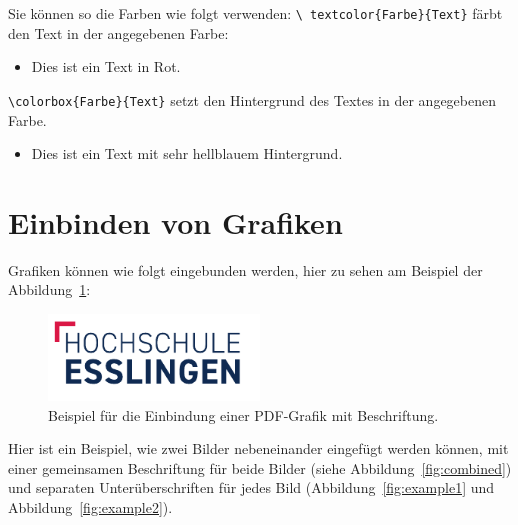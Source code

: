 \noindent Sie können so die Farben wie folgt verwenden: \texttt{\textbackslash
textcolor\{Farbe\}\{Text\}} färbt den Text in der angegebenen Farbe:

\begin{itemize}
  \item \textcolor{hse-rot}{Dies ist ein Text in Rot.}
\end{itemize}

\noindent \texttt{\textbackslash colorbox\{Farbe\}\{Text\}} setzt den Hintergrund des
Textes in der angegebenen Farbe.

\begin{itemize}
  \item \colorbox{hse-blau15}{Dies ist ein Text mit sehr hellblauem Hintergrund.}
\end{itemize}



\section*{Einbinden von Grafiken}

Grafiken können wie folgt eingebunden werden, hier zu sehen am Beispiel der
Abbildung~\ref{fig:example}:

\begin{figure}[htb!]
  \centering
  \includegraphics[width=0.5\textwidth]{figures/hs-esslingen-logo}
  \caption{Beispiel für die Einbindung einer PDF-Grafik mit Beschriftung.}
  \label{fig:example}
\end{figure}

Hier ist ein Beispiel, wie zwei Bilder nebeneinander eingefügt werden können,
mit einer gemeinsamen Beschriftung für beide Bilder (siehe
Abbildung~\ref{fig:combined}) und separaten Unterüberschriften für jedes Bild
(Abbildung~\ref{fig:example1} und Abbildung~\ref{fig:example2}).

